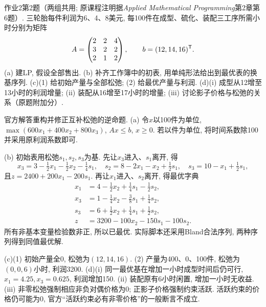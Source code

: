 \begin{exercise}\label{ass:15053-ps2-q2}
作业2第2题（两组共用; 原课程注明据\emph{Applied Mathematical Programming}第2章第6题）. 三轮胎每件利润为6、4、8美元, 每100件在成型、硫化、装配三工序所需小时分别为矩阵
\[
A=\begin{pmatrix}2&2&4\\3&2&2\\2&1&2\end{pmatrix},\qquad b=(12,14,16)^{\mathsf T}.
\]
(a) 建LP, 假设全部售出. (b) 补齐工作簿中的初表, 用单纯形法给出到最优表的换基序列. (c)(1) 给初始产量与全部松弛; (2) 给最优产量与利润. (d)(i) 成型从12增至13小时的利润增量; (ii) 装配从16增至17小时的增量; (iii) 讨论影子价格与松弛的关系（原题附加分）.
\end{exercise}
\begin{solution}
官方解答重构并修正互补松弛的逆命题. (a) 令$x$以100件为单位, $\max(600x_1+400x_2+800x_3)$, $Ax\le b$, $x\ge0$. 若以件为单位, 将时间系数除100并采用原利润系数即可.

(b) 初始表用松弛$s_1,s_2,s_3$为基. 先让$x_3$进入、$s_1$离开, 得
\[
x_3=3-\tfrac12x_1-\tfrac12x_2-\tfrac14s_1,\quad
s_2=8-2x_1-x_2+\tfrac12s_1,\quad s_3=10-x_1+\tfrac12s_1,
\]
且$z=2400+200x_1-200s_1$. 再让$x_1$进入、$s_2$离开, 得最优字典
\begin{align*}
x_1&=4-\tfrac12x_2+\tfrac14s_1-\tfrac12s_2,\\
x_3&=1-\tfrac14x_2-\tfrac38s_1+\tfrac14s_2,\\
s_3&=6+\tfrac12x_2+\tfrac14s_1+\tfrac12s_2,\\
z&=3200-100x_2-150s_1-100s_2.
\end{align*}
所有非基本变量检验数非正, 所以已最优. 实际脚本还采用Bland合法序列, 两种序列得到同值最优解.

(c)(1) 初始产量全0, 松弛为$(12,14,16)$. (2) 产量为400、0、100件, 松弛为$(0,0,6)$小时, 利润3200. (d)(i) 同一最优基在增加一小时成型时间后仍可行, $x_1=4.25,x_3=0.625$, 利润增加150. (ii) 装配原有6小时闲置, 增加一小时无收益. (iii) 非零松弛强制相应非负对偶价格为0; 正影子价格强制约束活跃. 活跃约束的价格仍可能为0, 官方“活跃约束必有非零价格”的一般断言不成立.
\end{solution}

